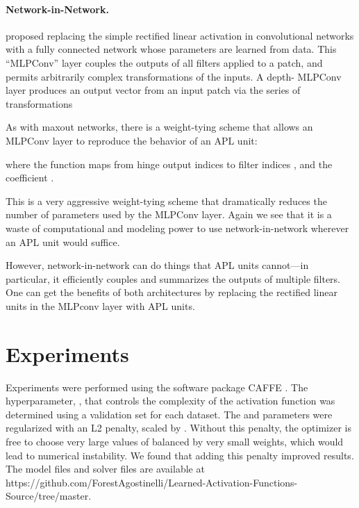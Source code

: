 \documentclass{article} \usepackage{iclr2015,times}
\begin{document}
\paragraph{Network-in-Network.}
\citet{lin2013network} proposed replacing the simple rectified linear activation in convolutional networks with a fully
connected network whose parameters are learned from data.  This
``MLPConv'' layer couples the outputs of all filters applied to a
patch, and permits arbitrarily complex transformations of the inputs.
A depth- MLPConv layer produces an output vector  from an
input patch  via the series of transformations

As with maxout networks, there is a weight-tying scheme that allows an
MLPConv layer to reproduce the behavior of an APL unit:

where the function  maps from hinge output indices  to
filter indices , and the coefficient .

This is a very aggressive weight-tying scheme that dramatically
reduces the number of parameters used by the MLPConv layer. Again we
see that it is a waste of computational and modeling power to use
network-in-network wherever an APL unit would suffice.



However, network-in-network can do things that APL units cannot---in
particular, it efficiently couples and summarizes the outputs of
multiple filters. One can get the benefits of both architectures by
replacing the rectified linear units in the MLPconv layer with
APL units.

 
\section{Experiments}
\label{sec:experiments}
Experiments were performed using the software package CAFFE \citep{jia2014caffe}. The hyperparameter, , that controls the complexity of the activation function was determined using a validation set for each dataset. The  and  parameters were regularized with an L2 penalty, scaled by . Without this penalty, the optimizer is free to choose very large values of  balanced by very small weights, which would lead to numerical instability. We found that adding this penalty improved results. The model files and solver files are available at https://github.com/ForestAgostinelli/Learned-Activation-Functions-Source/tree/master.
\end{document}
